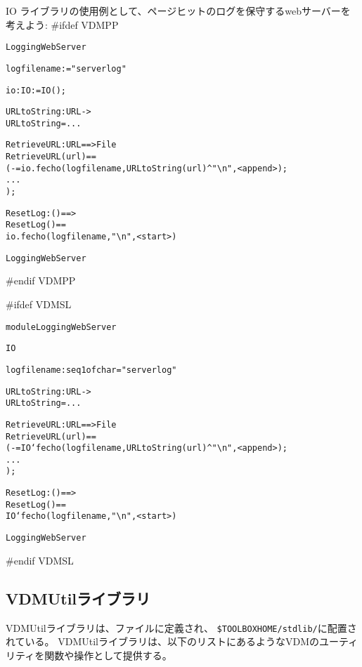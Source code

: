 \documentclass[\pformat,12pt]{jarticle}
\begin{document}
IO ライブラリの使用例として、ページヒットのログを保守するwebサーバーを考えよう:
#ifdef VDMPP
\begin{alltt}
   LoggingWebServer

      logfilename :  = "serverlog"

      io : IO :=  IO();

      URLtoString : URL -> 
      URLtoString = ...

      RetrieveURL : URL ==> File
      RetrieveURL(url) ==
        ( - = io.fecho(logfilename, URLtoString(url)^\verb+"\n"+, <append>);
         ... 
        );

      ResetLog : () ==> 
      ResetLog() ==
        io.fecho(logfilename,\verb+"\n"+,<start>)

   LoggingWebServer
\end{alltt}
#endif VDMPP

#ifdef VDMSL
\begin{alltt}
  module LoggingWebServer

       IO 

     


      logfilename : seq1 of char = "serverlog"

      URLtoString : URL ->   
      URLtoString = ...

      RetrieveURL : URL ==> File
      RetrieveURL(url) ==
        ( - = IO`fecho(logfilename, URLtoString(url)^\verb+"\n"+, <append>);
         ... 
        );

      ResetLog : () ==> 
      ResetLog() ==
        IO`fecho(logfilename,\verb+"\n"+,<start>)

   LoggingWebServer
\end{alltt}
#endif VDMSL

\subsection{VDMUtilライブラリ}

VDMUtilライブラリは、ファイルに定義され、
\verb+$TOOLBOXHOME/stdlib/+に配置されている。
VDMUtilライブラリは、以下のリストにあるようなVDMのユーティリティを関数や操作として提供する。
\end{document}
